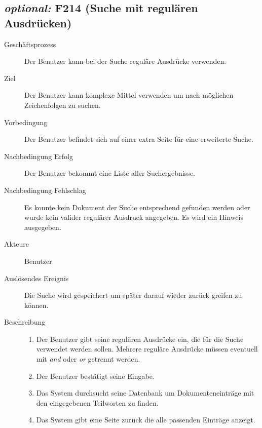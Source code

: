 \subsection{\emph{optional:} F214 (Suche mit regulären Ausdrücken)}
\label{F:regexSuche}
\begin{description}
  \item[Geschäftsprozess]Der Benutzer kann bei der Suche reguläre Ausdrücke verwenden.
  \item[Ziel]Der Benutzer kann komplexe Mittel verwenden um nach möglichen Zeichenfolgen zu suchen.
  \item[Vorbedingung]Der Benutzer befindet sich auf einer extra Seite für eine erweiterte Suche.
  \item[Nachbedingung Erfolg]Der Benutzer bekommt eine Liste aller Suchergebnisse.
  \item[Nachbedingung Fehlschlag]Es konnte kein Dokument der Suche entsprechend gefunden werden oder wurde kein valider regulärer Ausdruck angegeben. Es wird ein Hinweis ausgegeben.
  \item[Akteure]Benutzer
  \item[Auslösendes Ereignis]Die Suche wird gespeichert um später darauf wieder zurück greifen zu können.
  \item[Beschreibung]\hfill
    \begin{enumerate}
      \item Der Benutzer gibt seine regulären Ausdrücke ein, die für die Suche verwendet werden sollen. Mehrere reguläre Ausdrücke müssen eventuell mit \emph{and} oder \emph{or} getrennt werden.
      \item Der Benutzer bestätigt seine Eingabe.
      \item Das System durchsucht seine Datenbank um Dokumenteneinträge mit den eingegebenen Teilworten zu finden.
      \item Das System gibt eine Seite zurück die alle passenden Einträge anzeigt.
    \end{enumerate}
\end{description}

